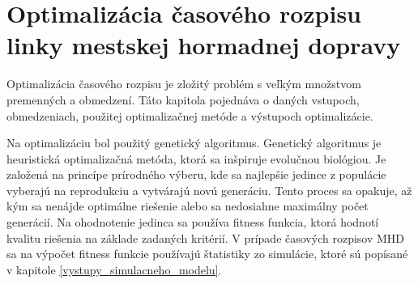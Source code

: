 \chapter{Optimalizácia časového rozpisu linky mestskej hormadnej dopravy} %
\label{optimalizacia}

Optimalizácia časového rozpisu je zložitý problém s veľkým množstvom premenných a obmedzení.
Táto kapitola pojednáva o daných vstupoch, obmedzeniach, použitej optimalizačnej metóde a výstupoch optimalizácie.

Na optimalizáciu bol použitý genetický algoritmus.
Genetický algoritmus je heuristická optimalizačná metóda, ktorá sa inšpiruje evolučnou biológiou.
Je založená na princípe prírodného výberu, kde sa najlepšie jedince z populácie vyberajú na reprodukciu a vytvárajú novú generáciu.
Tento proces sa opakuje, až kým sa nenájde optimálne riešenie alebo sa nedosiahne maximálny počet generácií.
Na ohodnotenie jedinca sa používa fitness funkcia, ktorá hodnotí kvalitu riešenia na základe zadaných kritérií.
V prípade časových rozpisov MHD sa na výpočet fitness funkcie používajú štatistiky zo simulácie, ktoré sú popísané v kapitole \ref{vystupy_simulacneho_modelu}.

